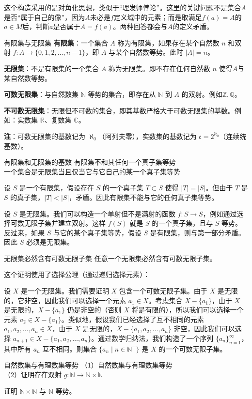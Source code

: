 \documentclass[lang=cn,11pt]{elegantbook}
\begin{document}
这个构造采用的是对角化思想，类似于“理发师悖论”。这里的关键问题不是集合$A$是否“属于自己的像”，因为$A$未必是$f$定义域中的元素；而是取满足$f(a)=A$的$a\in M$后，判断$a$是否属于$A=f(a)$。两种回答都会与$A$的定义矛盾。
\begin{definition}{有限集与无限集}
\textbf{有限集}：一个集合 $A$ 称为有限集，如果存在某个自然数 $n$ 和双射 $f: A \to \{0, 1, 2, \dots, n-1\}$，即 $A$ 与某个自然数等势。此时 $|A| = n$。

\textbf{无限集}：不是有限集的一个集合 $A$ 称为无限集。即不存在任何自然数 $n$ 使得$A$与某自然数等势。

\textbf{可数无限集}：与自然数集 $\mathbb{N}$ 等势的集合，即存在从 $\mathbb{N}$ 到 $A$ 的双射。例如$\mathbb{Z},\mathbb{Q}$。

\textbf{不可数无限集}：无限但不可数的集合，即其基数严格大于可数无限集的基数。例如：实数集 $\mathbb{R}$、复数集 $\mathbb{C}$。

\textbf{注}：可数无限集的基数记为 $\aleph_0$（阿列夫零），实数集的基数记为 $\mathfrak{c}=2^{\aleph_0}$（连续统基数）。
\end{definition}
\begin{theorem}{有限集和无限集的基数}
    有限集不和其任何一个真子集等势\\一个集合是无限集当且仅当它与它自己的某一个真子集等势
\end{theorem}
设 $S$ 是一个有限集，假设存在 $S$ 的一个真子集 $T \subset S$ 使得 $|T| = |S|$。但由于 $T$ 是 $S$ 的真子集，$|T| < |S|$，矛盾。因此有限集不能与它的任何真子集等势。

设 $S$ 是无限集。我们可以构造一个单射但不是满射的函数 $f: S \to S$，例如通过选择可数无限子集并建立双射。这样 $f(S)$ 就是 $S$ 的一个真子集，且与 $S$ 等势。反过来，如果 $S$ 与它的某个真子集等势，假设 $S$ 是有限集，则与第一部分矛盾。因此 $S$ 必须是无限集。
\begin{theorem}{无限集必然含有可数无限子集}
    任意一个无限集必然含有可数无限子集。
\end{theorem}
这个证明使用了选择公理（通过递归选择元素）：

设 $X$ 是一个无限集。我们需要证明 $X$ 包含一个可数无限子集。由于 $X$ 是无限的，它非空，因此我们可以选择一个元素 $a_1 \in X$。考虑集合 $X -\{a_1\}$，由于 $X$ 是无限的，$X - \{a_1\}$ 仍是非空的（否则 $X$ 将是有限的），所以我们可以选择一个元素 $a_2 \in X - \{a_1\}$。类似地，假设我们已经选择了互不相同的元素 $a_1, a_2, \dots, a_n \in X$，由于 $X$ 是无限的，$X- \{a_1, a_2, \dots, a_n\}$ 非空，因此我们可以选择 $a_{n+1} \in X-\{a_1, a_2, \dots, a_n\}$。通过数学归纳法，我们构造了一个序列 $\{a_n\}_{n=1}^\infty$，其中所有 $a_n$ 互不相同。则集合 $\{a_n \mid n \in \mathbb{N}^+\}$ 是 $X$ 的一个可数无限子集。
\begin{theorem}{自然数集与有理数集等势}
    （1）自然数集与有理数集等势\\ 
    （2）证明存在双射 $g: \mathbb{N} \to \mathbb{N} \times \mathbb{N}$
\end{theorem}
证明 $\mathbb{N} \times \mathbb{N}$ 与 $\mathbb{N}$ 等势。
\end{document}
